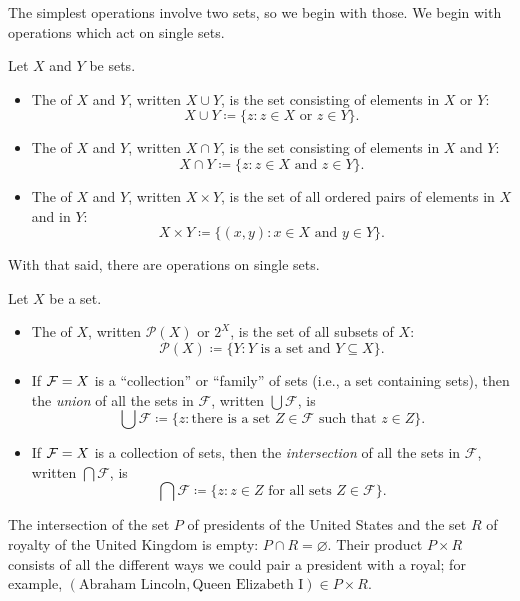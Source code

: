 \documentclass[../main.tex]{subfiles}
\begin{document}
The simplest operations involve two sets, so we begin with those.
We begin with operations which act on single sets.
\begin{definition}
    Let $X$ and $Y$ be sets.
    \begin{itemize}
        \item The  of $X$ and $Y$, written $X \cup Y$, is the set consisting of elements in $X$ or $Y$:
        \[X \cup Y \coloneqq \{z: z \in X \text{ or } z \in Y\}.\]
        \item The  of $X$ and $Y$, written $X \cap Y$, is the set consisting of elements in $X$ and $Y$:
        \[X \cap Y \coloneqq \{z: z \in X \text{ and } z \in Y\}.\]
        \item The  of $X$ and $Y$, written $X \times Y$, is the set of all ordered pairs of elements in $X$ and in $Y$:
        \[X \times Y \coloneqq \{(x, y): x \in X \text { and } y \in Y\}.\]
    \end{itemize}
\end{definition}
With that said, there are operations on single sets.
\begin{definition}
    Let $X$ be a set.
    \begin{itemize}
        \item The  of $X$, written $\mathcal P(X)$ or $2^X$, is the set of all subsets of $X$:
        \[\mathcal P(X) \coloneqq \{Y: Y \text{ is a set and } Y \subseteq X\}.\]
        \item If $\mathcal{F}=X$ is a ``collection'' or ``family'' of sets (i.e., a set containing sets), then the \emph{union} of all the sets in $\mathcal F$, written $\bigcup \mathcal F$, is
        \[\bigcup \mathcal F \coloneqq \{z: \text{there is a set } Z \in \mathcal F \text{ such that } z \in Z\}.\]
        \item If $\mathcal{F}=X$ is a collection of sets, then the \emph{intersection} of all the sets in $\mathcal F$, written $\bigcap \mathcal F$, is
        \[\bigcap \mathcal F \coloneqq \{z: z\in Z\text{ for all sets } Z \in \mathcal F\}.\]
    \end{itemize}
\end{definition}
\begin{example}
    The intersection of the set $P$ of presidents of the United States and the set $R$ of royalty of the United Kingdom is empty: $P \cap R = \varnothing$. Their product $P \times R$ consists of all the different ways we could pair a president with a royal; for example, $(\text{Abraham Lincoln},\text{Queen Elizabeth I})\in P \times R$.
\end{example}
\end{document}
